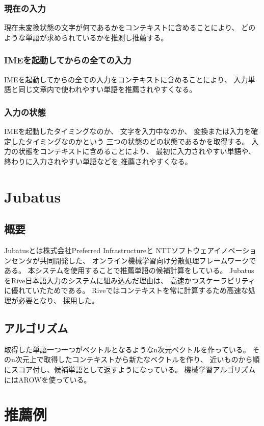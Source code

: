 \subsubsection{現在の入力}
現在未変換状態の文字が何であるかをコンテキストに含めることにより、
どのような単語が求められているかを推測し推薦する。

\subsubsection{IMEを起動してからの全ての入力}
IMEを起動してからの全ての入力をコンテキストに含めることにより、
入力単語と同じ文章内で使われやすい単語を推薦されやすくなる。

\subsubsection{入力の状態}
IMEを起動したタイミングなのか、
文字を入力中なのか、
変換または入力を確定したタイミングなのかという
三つの状態のどの状態であるかを取得する。
入力の状態をコンテキストに含めることにより、
最初に入力されやすい単語や、終わりに入力されやすい単語などを
推薦されやすくなる。

\section{Jubatus}
\label{sec:jubatus}

\subsection{概要}
Jubatus\cite{jubatus}とは株式会社Preferred Infrastructureと
NTTソフトウェアイノベーションセンタが共同開発した、
オンライン機械学習向け分散処理フレームワークである。
本システムを使用することで推薦単語の候補計算をしている。
JubatusをRive日本語入力のシステムに組み込んだ理由は、
高速かつスケーラビリティに優れていたためである。
Riveではコンテキストを常に計算するため高速な処理が必要となり、
採用した。

\subsection{アルゴリズム}
取得した単語一つ一つがベクトルとなるようなn次元ベクトルを作っている。
そのn次元上で取得したコンテキストから新たなベクトルを作り、
近いものから順にスコア付し、候補単語として返すようになっている。
機械学習アルゴリズムにはAROW\cite{AROW}を使っている。

\section{推薦例}

